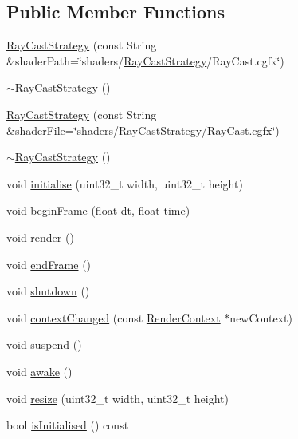 \subsection*{\-Public \-Member \-Functions}
\begin{DoxyCompactItemize}
\item 
\hyperlink{class_verdi_1_1_ray_cast_strategy_a44cc830e606b2ec73c1c506994194b95}{\-Ray\-Cast\-Strategy} (const \-String \&shader\-Path=\char`\"{}shaders/\hyperlink{class_verdi_1_1_ray_cast_strategy}{\-Ray\-Cast\-Strategy}/\-Ray\-Cast.\-cgfx\char`\"{})
\item 
\hyperlink{class_verdi_1_1_ray_cast_strategy_a28ab5b20bf87df214622495e4dc15363}{$\sim$\-Ray\-Cast\-Strategy} ()
\item 
\hyperlink{class_verdi_1_1_ray_cast_strategy_a0ac72ce2617906f2246c42ef058eb2c3}{\-Ray\-Cast\-Strategy} (const \-String \&shader\-File=\char`\"{}shaders/\hyperlink{class_verdi_1_1_ray_cast_strategy}{\-Ray\-Cast\-Strategy}/\-Ray\-Cast.\-cgfx\char`\"{})
\item 
\hyperlink{class_verdi_1_1_ray_cast_strategy_a28ab5b20bf87df214622495e4dc15363}{$\sim$\-Ray\-Cast\-Strategy} ()
\item 
void \hyperlink{class_verdi_1_1_ray_cast_strategy_a5750edcfc0d873970b13c6fba3978a9d}{initialise} (uint32\-\_\-t width, uint32\-\_\-t height)
\item 
void \hyperlink{class_verdi_1_1_ray_cast_strategy_a1ee8ca66c4ebc651c5b23985bea94cf3}{begin\-Frame} (float dt, float time)
\item 
void \hyperlink{class_verdi_1_1_ray_cast_strategy_a30c9308caa1f99b7db6993fdb49e12cc}{render} ()
\item 
void \hyperlink{class_verdi_1_1_ray_cast_strategy_ac0d9b6cd0962f3d0076c15ab0b0f5a49}{end\-Frame} ()
\item 
void \hyperlink{class_verdi_1_1_ray_cast_strategy_aeb9c50d501ec369553637622aed55cbd}{shutdown} ()
\item 
void \hyperlink{class_verdi_1_1_ray_cast_strategy_a0eb9af58fef4e974e378062c03eb787b}{context\-Changed} (const \hyperlink{class_verdi_1_1_render_context}{\-Render\-Context} $\ast$new\-Context)
\item 
void \hyperlink{class_verdi_1_1_ray_cast_strategy_a23af8b285ef2de2957f397b9674c7a01}{suspend} ()
\item 
void \hyperlink{class_verdi_1_1_ray_cast_strategy_a1fc2d8d4067b242934ac6cb4c9800a22}{awake} ()
\item 
void \hyperlink{class_verdi_1_1_ray_cast_strategy_a54f194bbd0187871d92fbacbe5fce8f2}{resize} (uint32\-\_\-t width, uint32\-\_\-t height)
\item 
bool \hyperlink{class_verdi_1_1_ray_cast_strategy_a384a2f7012b89193c7be6f126f62a4f7}{is\-Initialised} () const 
\end{DoxyCompactItemize}
